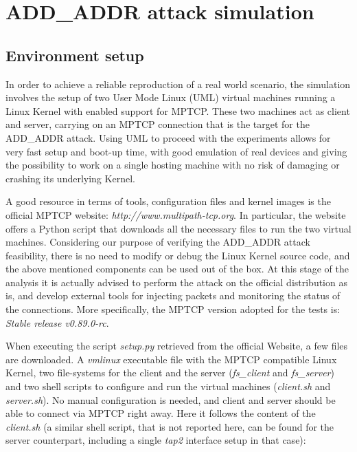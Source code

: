 \chapter{ADD\_ADDR attack simulation}
\label{chap:addaddrattackexecution}

\section{Environment setup}
\label{envsetup}
In order to achieve a reliable reproduction of a real world scenario, the simulation involves the setup of two User Mode Linux (UML) virtual machines running a Linux Kernel with enabled support for MPTCP. These two machines act as client and server, carrying on an MPTCP connection that is the target for the ADD\_ADDR attack. 
Using UML to proceed with the experiments allows for very fast setup and boot-up time, with good emulation of real devices and giving the possibility to work on a single hosting machine with no risk of damaging or crashing its underlying Kernel.

A good resource in terms of tools, configuration files and kernel images is the official MPTCP website:
\textit{http://www.multipath-tcp.org}. In particular, the website offers a Python script that downloads all the necessary files to run the two virtual machines. Considering our purpose of verifying the ADD\_ADDR attack feasibility, there is no need to modify or debug the Linux Kernel source code, and the above mentioned components can be used out of the box. At this stage of the analysis it is actually advised to perform the attack on the official distribution as is, and develop external tools for injecting packets and monitoring the status of the connections. More specifically, the MPTCP version adopted for the tests is: \textit{Stable release v0.89.0-rc}.

When executing the script \textit{setup.py} retrieved from the official Website, a few files are downloaded. A \textit{vmlinux} executable file with the MPTCP compatible Linux Kernel, two file-systems for the client and the server (\textit{fs\_client} and \textit{fs\_server}) and two shell scripts to configure and run the virtual machines (\textit{client.sh} and \textit{server.sh}). No manual configuration is needed, and client and server should be able to connect via MPTCP right away.
Here it follows the content of the \textit{client.sh} (a similar shell script, that is not reported here, can be found for the server counterpart, including a single \textit{tap2} interface setup in that case):



